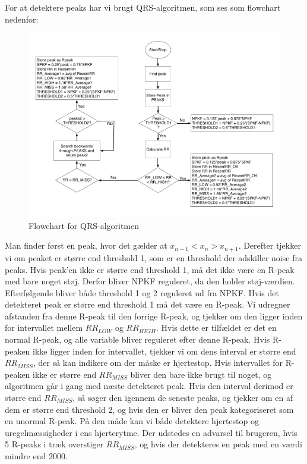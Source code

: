 \documentclass{article}
\begin{document}
For at detektere peaks har vi brugt QRS-algoritmen, som ses som flowchart nedenfor:
\begin{figure}[h]
	\centering
	\includegraphics[scale=0.5]{QRS-diagram.png}
	\caption{Flowchart for QRS-algoritmen}
\end{figure}

Man finder først en peak, hvor det gælder at $x_{n-1} < x_n > x_{n+1}$. Derefter tjekker vi om peaket er større end threshold 1, som er en threshold der adskiller noise fra peaks. Hvis peak’en ikke er større end threshold 1, må det ikke være en R-peak med bare noget støj. Derfor bliver NPKF reguleret, da den holder støj-værdien. Efterfølgende bliver både threshold 1 og 2 reguleret ud fra NPKF. Hvis det detekteret peak er større end threshold 1 må det være en R-peak. Vi udregner afstanden fra denne R-peak til den forrige R-peak, og tjekker om den ligger inden for intervallet mellem $RR_{LOW}$ og $RR_{HIGH}$. Hvis dette er tilfældet er det en normal R-peak, og alle variable bliver reguleret efter denne R-peak. Hvis R-peaken ikke ligger inden for intervallet, tjekker vi om dens interval er større end $RR_{MISS}$, der så kan indikere om der måske er hjertestop. Hvis intervallet for R-peaken ikke er større end $RR_{MISS}$ bliver den bare ikke brugt til noget, og algoritmen går i gang med næste detekteret peak. Hvis den interval derimod er større end $RR_{MISS}$, så søger den igennem de seneste peaks, og tjekker om en af dem er større end threshold 2, og hvis den er bliver den peak kategoriseret som en unormal R-peak. På den måde kan vi både detektere hjertestop og uregelmæssigheder i ens hjerterytme. 
Der udstedes en advarsel til brugeren, hvis 5 R-peaks i træk overstiger $RR_{MISS}$, og hvis der detekteres en peak med en værdi mindre end 2000.
\end{document}
